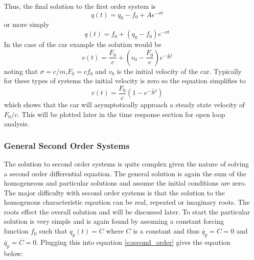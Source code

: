 Thus, the final solution to the first order system is 
\begin{equation}
    q(t) = q_0 - f_0 + Ae^{-\sigma t}
\end{equation}
or more simply
\begin{equation}
    q(t) = f_0 + (q_0 - f_0)e^{-\sigma t}
\end{equation}
In the case of the car example the solution would be
\begin{equation}
    v(t) = \frac{F_0}{c} + \left(v_0 - \frac{F_0}{c}\right)e^{-\frac{c}{m}t}
\end{equation}
noting that $\sigma = c/m$,$F_0 = cf_0$ and $v_0$ is the initial velocity of the car. Typically for these types of systems the initial velocity is zero so the equation simplifies to
\begin{equation}\label{e:first_order_solution}
    v(t) = \frac{F_0}{c}\left(1 - e^{-\frac{c}{m}t}\right)
\end{equation}
which shows that the car will asymptotically approach a steady state velocity of $F_0/c$. This will be plotted later in the time response section for open loop analysis.

\subsubsection{General Second Order Systems}

The solution to second order systems is quite complex given the nature of solving a second order differential equation. The general solution is again the sum of the homogeneous and particular solutions and assume the initial conditions are zero. The major difficulty with second order systems is that the solution to the homogenous characteristic eqaution can be real, repeated or imaginary roots. The roots effect the overall solution and will be discussed later. To start the particular solution is very simple and is again found by assuming a constant forcing function $f_0$ such that $q_p(t)=C$ where $C$ is a constant and thus $\dot{q_p}=\dot{C}=0$ and $\ddot{q_p}=\ddot{C}=0$. Plugging this into equation \ref{e:second_order} gives the eqaution below:

